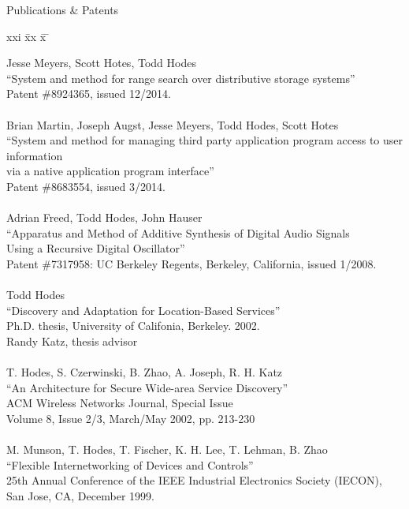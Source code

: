 \bigskip
\begin{bf} \large
Publications \& Patents
\end{bf}
\begin{tabbing}
xxi \= xx \= x \= \kill

\>    Jesse Meyers, Scott Hotes, Todd Hodes \\
\>\>      ``System and method for range search over distributive storage systems'' \\
\>\>    Patent \#8924365, issued 12/2014. \\

\smallskip \\[-3pt]
\>    Brian Martin, Joseph Augst, Jesse Meyers, Todd Hodes, Scott Hotes \\
\>\>      ``System and method for managing third party application program access to user information \\
\>\>      via a native application program interface'' \\
\>\>    Patent \#8683554, issued 3/2014. \\

\smallskip \\[-3pt]
\>    Adrian Freed, Todd Hodes, John Hauser \\
\>\>      ``Apparatus and Method of Additive Synthesis of Digital Audio Signals \\
\>\>   Using a Recursive Digital Oscillator'' \\
\>\>    Patent \#7317958: UC Berkeley Regents, Berkeley, California, issued 1/2008. \\

\smallskip \\[-3pt]
\>    Todd Hodes \\
\>\>      ``Discovery and Adaptation for Location-Based Services'' \\
\>\>    Ph.D. thesis, University of Califonia, Berkeley. 2002. \\
\>\>    Randy Katz, thesis advisor \\

\smallskip \\[-3pt]
\>    T. Hodes, S. Czerwinski, B. Zhao, A. Joseph, R. H. Katz \\
\>\>      ``An Architecture for Secure Wide-area Service Discovery'' \\
\>\>       ACM Wireless Networks Journal, Special Issue \\
\>\>       Volume 8, Issue 2/3, March/May 2002, pp. 213-230 \\

\smallskip \\[-3pt]
\>   M. Munson, T. Hodes, T. Fischer, K. H. Lee, T. Lehman, B. Zhao \\
\>\>      ``Flexible Internetworking of Devices and Controls'' \\
\>\>        25th Annual Conference of the IEEE Industrial Electronics Society (IECON),  \\
\>\>	    San Jose, CA, December 1999. \\

\end{tabbing}
